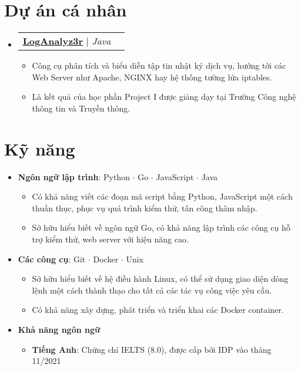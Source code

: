 \documentclass[letterpaper,10pt]{article}
\makeatletter
\newcommand{\link}[2]{\href{#1}{\color{blue}\underline{#2}}}
\newcommand{\resumeItem}[1]{
  \item\small{
    {#1 \vspace{-2pt}}
  }
}
\newcommand{\resumeProjectHeading}[2]{
  \item
  \begin{tabular*}{0.97\textwidth}{l@{\extracolsep{\fill}}r}
    \small#1 & #2 \\
  \end{tabular*}\vspace{-7pt}
}
\newcommand{\resumeSubHeadingListStart}{\begin{itemize}[leftmargin=0.15in, label={}]}
\newcommand{\resumeSubHeadingListEnd}{\end{itemize}}
\newcommand{\resumeItemListStart}{\begin{itemize}}
\newcommand{\resumeItemSubListStart}{\begin{itemize}\setlength\itemsep{0.4em}}
\newcommand{\resumeItemListEnd}{\end{itemize}\vspace{-5pt}}
\newcommand{\resumeItemSubListEnd}{\end{itemize}}
\makeatother
\begin{document}
\section{Dự án cá nhân}
\resumeSubHeadingListStart
\resumeProjectHeading
{\link{https://github.com/teebow1e/loganalyz3r}{\textbf{LogAnalyz3r}} $|$ \emph{Java}}{}
\resumeItemListStart
\resumeItem{Công cụ phân tích và biểu diễn tập tin nhật ký dịch vụ, hướng tới các Web Server như Apache, NGINX hay hệ thống tường lửa iptables.} 
\resumeItem{Là kết quả của học phần Project I được giảng dạy tại Trường Công nghệ thông tin và Truyền thông.
}
\resumeItemListEnd
\resumeSubHeadingListEnd


\section{Kỹ năng}
\resumeItemListStart
\resumeItem{\textbf{Ngôn ngữ lập trình}: Python $\cdot$ Go $\cdot$ JavaScript $\cdot$ Java}
\resumeItemSubListStart
\resumeItem{Có khả năng viết các đoạn mã script bằng Python, JavaScript một cách thuần thục, phục vụ quá trình kiểm thử, tấn công thâm nhập.}
\resumeItem{Sở hữu hiểu biết về ngôn ngữ Go, có khả năng lập trình các công cụ hỗ trợ kiểm thử, web server với hiệu năng cao.}
\resumeItemSubListEnd

\resumeItem{\textbf{Các công cụ}: Git $\cdot$ Docker $\cdot$ Unix}
\resumeItemSubListStart
\resumeItem{Sở hữu hiểu biết về hệ điều hành Linux, có thể sử dụng giao diện dòng lệnh một cách thành thạo cho tất cả các tác vụ công việc yêu cầu.}
\resumeItem{Có khả năng xây dựng, phát triển và triển khai các Docker container.}
\resumeItemSubListEnd

\resumeItem{\textbf{Khả năng ngôn ngữ}}
\resumeItemSubListStart
\resumeItem{\textbf{Tiếng Anh}: Chứng chỉ IELTS (8.0), được cấp bởi IDP vào tháng 11/2021}
\resumeItemSubListEnd
\resumeItemListEnd
\end{document}
